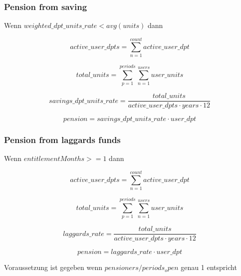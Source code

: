 \subsubsection*{Pension from saving}

Wenn $weighted\_dpt\_units\_rate < avg(units)$ dann 

\begin{equation}
	active\_user\_dpts = 
	\sum_{n=1}^{count} active\_user\_dpt
\end{equation}

\begin{equation}
	total\_units = 	
	\sum_{p=1}^{periods} \sum_{n=1}^{users} user\_units	
\end{equation}

\begin{equation}
	savings\_dpt\_units\_rate = 	
	\frac{total\_units} 
	{active\_user\_dpts \cdot years \cdot 12}		
\end{equation}

\begin{equation}
	pension = savings\_dpt\_units\_rate \cdot user\_dpt
\end{equation}


\subsubsection*{Pension from laggards funds}

Wenn $entitlementMonths >= 1$ dann 

\begin{equation*}
	active\_user\_dpts = 
	\sum_{n=1}^{count} active\_user\_dpt
\end{equation*}

\begin{equation*}
	total\_units = 	
	\sum_{p=1}^{periods} \sum_{n=1}^{users} user\_units	
\end{equation*}

\begin{equation*}
	laggards\_rate = 	
	\frac{total\_units} 
	{active\_user\_dpts \cdot years \cdot 12}		
\end{equation*}

\begin{equation*}
	pension = laggards\_rate \cdot user\_dpt
\end{equation*}


Voraussetzung ist gegeben wenn $pensioners / periods_open$ genau 1 entspricht
